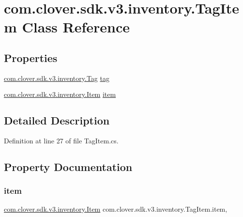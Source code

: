 \hypertarget{classcom_1_1clover_1_1sdk_1_1v3_1_1inventory_1_1_tag_item}{}\section{com.\+clover.\+sdk.\+v3.\+inventory.\+Tag\+Item Class Reference}
\label{classcom_1_1clover_1_1sdk_1_1v3_1_1inventory_1_1_tag_item}
\subsection*{Properties}
\begin{DoxyCompactItemize}
\item 
\hyperlink{classcom_1_1clover_1_1sdk_1_1v3_1_1inventory_1_1_tag}{com.\+clover.\+sdk.\+v3.\+inventory.\+Tag} \hyperlink{classcom_1_1clover_1_1sdk_1_1v3_1_1inventory_1_1_tag_item_a8f39ec699294a8fcf7f798331c101d2c}{tag}
\item 
\hyperlink{classcom_1_1clover_1_1sdk_1_1v3_1_1inventory_1_1_item}{com.\+clover.\+sdk.\+v3.\+inventory.\+Item} \hyperlink{classcom_1_1clover_1_1sdk_1_1v3_1_1inventory_1_1_tag_item_a8949d2793987e0696940b9b7fce35928}{item}
\end{DoxyCompactItemize}


\subsection{Detailed Description}


Definition at line 27 of file Tag\+Item.\+cs.



\subsection{Property Documentation}
\mbox{\label{classcom_1_1clover_1_1sdk_1_1v3_1_1inventory_1_1_tag_item_a8949d2793987e0696940b9b7fce35928}} 
\subsubsection{\texorpdfstring{item}{item}}
{\footnotesize\ttfamily \hyperlink{classcom_1_1clover_1_1sdk_1_1v3_1_1inventory_1_1_item}{com.\+clover.\+sdk.\+v3.\+inventory.\+Item} com.\+clover.\+sdk.\+v3.\+inventory.\+Tag\+Item.\+item\hspace{0.3cm}{\ttfamily [get]}, {\ttfamily [set]}}



